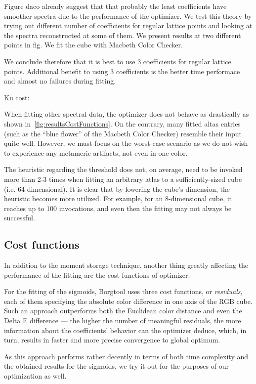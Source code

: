 Figure daco already suggest that that probably the least coefficients have smoother spectra due to the performance of the optimizer. We test this theory by trying out different number of coefficients for regular lattice points and looking at the spectra reconstructed at some of them. We present results at two different points in fig. We fit the cube with Macbeth Color Checker.

We conclude therefore that it is best to use 3 coefficients for regular lattice points. Additional benefit to using 3 coefficients is the better time performace and almost no failures during fitting.

Ku cost:

When fitting other spectral data, the optimizer does not behave as drastically as shown in~\cref{fig:resultsCostFunctions}. On the contrary, many fitted altas entries (such as the ``blue flower'' of the Macbeth Color Checker) resemble their input quite well. However, we must focus on the worst-case scenario as we do not wish to experience any metameric artifacts, not even in one color.

The heuristic regarding the threshold does not, on average, need to be invoked more than 2-3 times when fitting an arbitrary atlas to a sufficiently-sized cube (i.e. 64-dimensional). It is clear that by lowering the cube's dimension, the heuristic becomes more utilized. For example, for an 8-dimensional cube, it reaches up to 100 invocations, and even then the fitting may not always be successful.

\subsection{Cost functions} \label{ssec:costFunctions}

In addition to the moment storage technique, another thing greatly affecting the performance of the fitting are the cost functions of optimizer.

For the fitting of the sigmoids, Borgtool uses three cost functions, or \emph{residuals}, each of them specifying the absolute color difference in one axis of the RGB cube. Such an approach outperforms both the Euclidean color distance and even the Delta E difference --- the higher the number of meaningful residuals, the more information about the coefficients' behavior can the optimizer deduce, which, in turn, results in faster and more precise convergence to global optimum.

As this approach performs rather decently in terms of both time complexity and the obtained results for the sigmoids, we try it out for the purposes of our optimization as well. 

